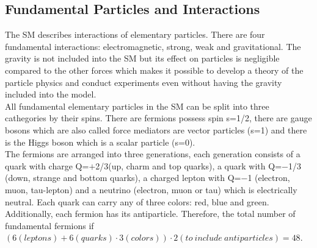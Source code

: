 \subsection{Fundamental Particles and Interactions}
\label{sec:Intro_FundParticles}



The SM describes interactions of elementary particles. There are four fundamental interactions: electromagnetic, strong, weak and gravitational. The gravity is not included into the SM but its effect on particles is negligible compared to the other forces which makes it possible to develop a theory of the particle physics and conduct experiments even without having the gravity included into the model.\\ 

All fundamental elementary particles in the SM can be split into three cathegories by their spins. There are fermions possess spin s=1/2, there are gauge bosons which are also called force mediators are vector particles (s=1) and there is the Higgs boson which is a scalar particle (s=0). \\

The fermions are arranged into three generations, each generation consists of a quark with charge Q=$+$2/3(up, charm and top quarks), a quark with Q=$-$1/3 (down, strange and bottom quarks), a charged lepton with Q=$-$1 (electron, muon, tau-lepton) and a neutrino (electron, muon or tau) which is electrically neutral. Each quark can carry any of three colors: red, blue and green. Additionally, each fermion has its antiparticle. Therefore, the total number of fundamental fermions if $(6 (leptons)+6 (quarks) \cdot 3 (colors) ) \cdot 2 (to~include~antiparticles) = 48$.\\ 

